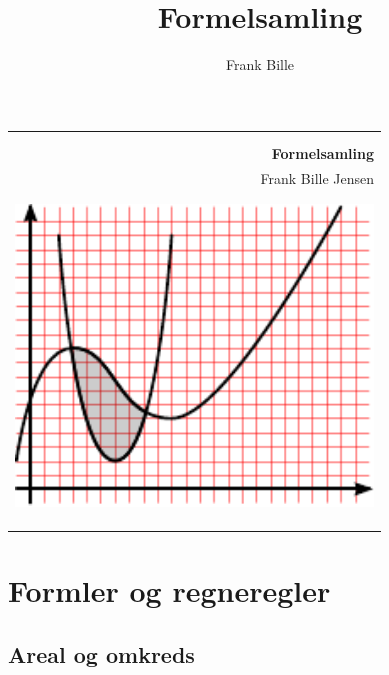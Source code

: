 \documentclass[11pt,a5paper,fleqn,leqno]{book}
\author{Frank Bille}
\title{Formelsamling}
\begin{document}
\setlength{\parindent}{0cm}

\frontmatter

\thispagestyle{empty}
\setlength{\arrayrulewidth}{0.1cm}
\null
\begin{flushright}
  \begin{tabular}{r|}
    \rule{0pt}{3ex} \\
    \rule{0pt}{3ex} \\
    \Huge \textsf{\textbf{Formelsamling}}
    \rule{0pt}{4ex} \\
    \large \textsf{Frank Bille Jensen}
    \rule{0pt}{3ex} \\
    \rule{0pt}{3ex} \\
    \rule{0pt}{3ex} \\
    \includegraphics[width=9.5cm]{cover.pdf} \\
    \rule{0pt}{3ex} \\
    \rule{0pt}{3ex} \\
    \rule{0pt}{3ex} \\
  \end{tabular}
\end{flushright}
\cleardoublepage
\setlength{\arrayrulewidth}{0.4pt}

\tableofcontents

\mainmatter

\pagestyle{headings}

\chapter{Formler og regneregler}

\newpage

\section{Areal og omkreds}
\end{document}
